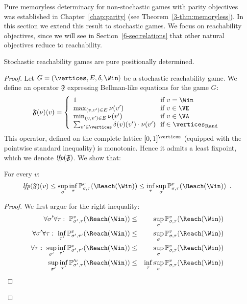 
Pure memoryless determinacy for non-stochastic games with parity
objectives was established in Chapter~\ref{chap:parity} (see
Theorem~\ref{3-thm:memoryless}). In this section we extend this result
to stochastic games. We focus on reachability objectives, since we
will see in Section~\ref{6-sec:relations} that other natural
objectives reduce to reachability.



\begin{theorem}
  \label{6-thm:determinacy}
  Stochastic reachability games are pure positionally determined.
\end{theorem}

\begin{proof}
  Let $G = (\vertices,E,\delta,\Win)$ be a stochastic reachability
  game.  We define an operator $\mathfrak{F}$ expressing Bellman-like
  equations for the game $G$:
  \[
  \mathfrak{F}(\nu)(v) = \left\{\begin{array}{l@{~~}l}
      1 & \text{if}\ v = \Win \\
      \max_{(v,v') \in E} \nu(v') & \text{if}\ v \in \VE \\
      \min_{(v,v') \in E} \nu(v') & \text{if}\ v \in \VA \\
      \sum_{v' \in \vertices} \delta(v)(v') \cdot \nu(v') & \text{if} \in \Randomvertices
    \end{array}\right.
  \]
  This operator, defined on the complete lattice $[0,1]^{\vertices}$
  (equipped with the pointwise standard inequality) is
  monotonic. Hence it admits a least fixpoint, which we denote
  $\textit{lfp}(\mathfrak{F})$.  We show that:
  \begin{lemma}
    \label{6-lem:lfpgeval}
    For every $v$:
    \[
    \lfp(\mathfrak{F}) (v) \le \sup_\sigma \inf_\tau
    \probm_{\sigma,\tau}^v(\Reach(\Win)) \le \inf_\tau \sup_\sigma
    \probm_{\sigma,\tau}^v(\Reach(\Win)) \enspace.
    \]
  \end{lemma}
  \begin{proof}
    We first argue for the right inequality:
    \begin{eqnarray*}
      \forall \sigma' \forall \tau:\
      \probm_{\sigma',\tau}^v(\Reach(\Win)) & \le & \sup_\sigma
      \probm_{\sigma,\tau}^v(\Reach(\Win)) \\
      \forall \sigma'\forall \tau :\  \inf_{\tau'}
      \probm_{\sigma',\tau'}^v(\Reach(\Win)) & \le & \sup_\sigma
      \probm_{\sigma,\tau}^v(\Reach(\Win)) \\
      \forall \tau:\ \sup_{\sigma'} \inf_{\tau'}
      \probm_{\sigma',\tau'}^v(\Reach(\Win)) & \le & \sup_\sigma
      \probm_{\sigma,\tau}^v(\Reach(\Win)) \\
      \sup_{\sigma'} \inf_{\tau'}
      \probm_{\sigma',\tau}'^v(\Reach(\Win)) & \le & \inf_{\tau} \sup_\sigma
      \probm_{\sigma,\tau}^v(\Reach(\Win)) 
    \end{eqnarray*}


\end{proof}
\end{proof}
